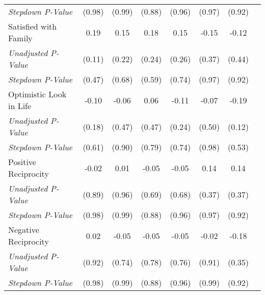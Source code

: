 \begin{tabular}{l c c c c c c c}
\quad \textit{Stepdown P-Value} & (0.98) & (0.99) & (0.88) & (0.96) & (0.97) & (0.92) \\
Satisfied with Family & 0.19 & 0.15 & 0.18 & 0.15 & -0.15 & -0.12 \\
\quad \textit{Unadjusted P-Value} & (0.11) & (0.22) & (0.24) & (0.26) & (0.37) & (0.44) \\
\quad \textit{Stepdown P-Value} & (0.47) & (0.68) & (0.59) & (0.74) & (0.97) & (0.92) \\
Optimistic Look in Life & -0.10 & -0.06 & 0.06 & -0.11 & -0.07 & -0.19 \\
\quad \textit{Unadjusted P-Value} & (0.18) & (0.47) & (0.47) & (0.24) & (0.50) & (0.12) \\
\quad \textit{Stepdown P-Value} & (0.61) & (0.90) & (0.79) & (0.74) & (0.98) & (0.53) \\
Positive Reciprocity & -0.02 & 0.01 & -0.05 & -0.05 & 0.14 & 0.14 \\
\quad \textit{Unadjusted P-Value} & (0.89) & (0.96) & (0.69) & (0.68) & (0.37) & (0.37) \\
\quad \textit{Stepdown P-Value} & (0.98) & (0.99) & (0.88) & (0.96) & (0.97) & (0.92) \\
Negative Reciprocity & 0.02 & -0.05 & -0.05 & -0.05 & -0.02 & -0.18 \\
\quad \textit{Unadjusted P-Value} & (0.92) & (0.74) & (0.78) & (0.76) & (0.91) & (0.35) \\
\quad \textit{Stepdown P-Value} & (0.98) & (0.99) & (0.88) & (0.96) & (0.99) & (0.92) \\
\bottomrule
\end{tabular}
